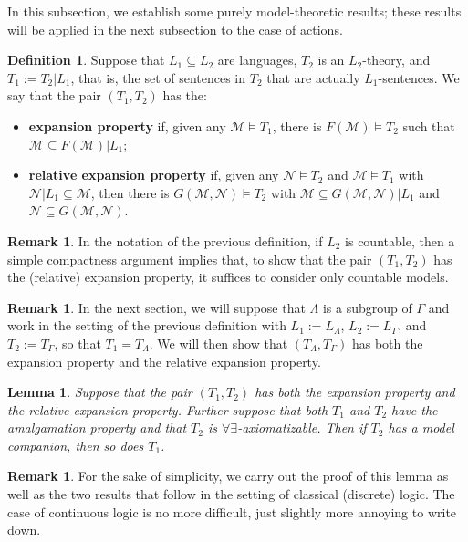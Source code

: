 \documentclass[12pt]{amsart}
\newtheorem{lem}[thm]{Lemma}
\theoremstyle{definition}
\newtheorem{defn}[thm]{Definition}
\newtheorem{remark}[thm]{Remark}
\def\cal{\mathcal}
\begin{document}
In this subsection, we establish some purely model-theoretic results; these results will be applied in the next subsection to the case of actions.

\begin{defn}
Suppose that $L_1\subseteq L_2$ are languages, $T_2$ is an $L_2$-theory, and $T_1:=T_2|L_1$, that is, the set of sentences in $T_2$ that are actually $L_1$-sentences.  We say that the pair $(T_1,T_2)$ has the:
\begin{itemize}
    \item \textbf{expansion property} if, given any $\cal M\models T_1$, there is $F(\cal M)\models T_2$ such that $\cal M\subseteq F(\cal M)|L_1$;
    \item \textbf{relative expansion property} if, given any $\cal N\models T_2$ and $\cal M\models T_1$ with $\cal N|L_1\subseteq \cal M$, then there is $G(\cal M,\cal N)\models T_2$ with $\cal M\subseteq G(\cal M,\cal N)|L_1$ and $\cal N\subseteq G(\cal M,\cal N)$.
\end{itemize}
\end{defn}

\begin{remark}
In the notation of the previous definition, if $L_2$ is countable, then a simple compactness argument implies that, to show that the pair $(T_1,T_2)$ has the (relative) expansion property, it suffices to consider only countable models.
\end{remark}

\begin{remark}
In the next section, we will suppose that $\Lambda$ is a subgroup of $\Gamma$ and work in the setting of the previous definition with $L_1:=L_\Lambda$, $L_2:=L_\Gamma$, and $T_2:=T_\Gamma$, so that $T_1=T_\Lambda$.  We will then show that $(T_\Lambda,T_\Gamma)$ has both the expansion property and the relative expansion property.
\end{remark}

\begin{lem}\label{mcdown}
Suppose that the pair $(T_1,T_2)$ has both the expansion property and the relative expansion property.  Further suppose that both $T_1$ and $T_2$ have the amalgamation property and that $T_2$ is $\forall\exists$-axiomatizable.  Then if $T_2$ has a model companion, then so does $T_1$.
\end{lem}

\begin{remark}
For the sake of simplicity, we carry out the proof of this lemma as well as the two results that follow in the setting of classical (discrete) logic.  The case of continuous logic is no more difficult, just slightly more annoying to write down.
\end{remark}
\end{document}
